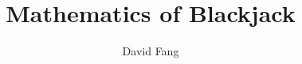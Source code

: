 \documentclass{book}
\begin{document}
\title{Mathematics of Blackjack}
\author{David Fang}
\maketitle




% 

\clearpage
\printindex
\end{document}
